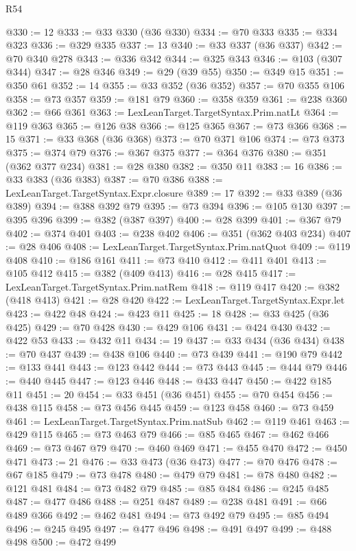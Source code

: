 \begin{lexlean}{R54}
\begin{coremodule}
@330 := 12
@333 := @33 @330 (@36 @330)
@334 := @70 @333
@335 := @334 @323
@336 := @329 @335
@337 := 13
@340 := @33 @337 (@36 @337)
@342 := @70 @340 @278
@343 := @336 @342
@344 := @325 @343
@346 := @103 (@307 @344)
@347 := @28 @346
@349 := @29 (@39 @55)
@350 := @349 @15
@351 := @350 @61
@352 := 14
@355 := @33 @352 (@36 @352)
@357 := @70 @355 @106
@358 := @73 @357
@359 := @181 @79
@360 := @358 @359
@361 := @238 @360
@362 := @66 @361
@363 := LexLeanTarget.TargetSyntax.Prim.natLt
@364 := @119 @363
@365 := @126 @38
@366 := @125 @365
@367 := @73 @366
@368 := 15
@371 := @33 @368 (@36 @368)
@373 := @70 @371 @106
@374 := @73 @373
@375 := @374 @79
@376 := @367 @375
@377 := @364 @376
@380 := @351 (@362 @377 @234)
@381 := @28 @380
@382 := @350 @11
@383 := 16
@386 := @33 @383 (@36 @383)
@387 := @70 @386
@388 := LexLeanTarget.TargetSyntax.Expr.closure
@389 := 17
@392 := @33 @389 (@36 @389)
@394 := @388 @392 @79
@395 := @73 @394
@396 := @105 @130
@397 := @395 @396
@399 := @382 (@387 @397)
@400 := @28 @399
@401 := @367 @79
@402 := @374 @401
@403 := @238 @402
@406 := @351 (@362 @403 @234)
@407 := @28 @406
@408 := LexLeanTarget.TargetSyntax.Prim.natQuot
@409 := @119 @408
@410 := @186 @161
@411 := @73 @410
@412 := @411 @401
@413 := @105 @412
@415 := @382 (@409 @413)
@416 := @28 @415
@417 := LexLeanTarget.TargetSyntax.Prim.natRem
@418 := @119 @417
@420 := @382 (@418 @413)
@421 := @28 @420
@422 := LexLeanTarget.TargetSyntax.Expr.let
@423 := @422 @48
@424 := @423 @11
@425 := 18
@428 := @33 @425 (@36 @425)
@429 := @70 @428
@430 := @429 @106
@431 := @424 @430
@432 := @422 @53
@433 := @432 @11
@434 := 19
@437 := @33 @434 (@36 @434)
@438 := @70 @437
@439 := @438 @106
@440 := @73 @439
@441 := @190 @79
@442 := @133 @441
@443 := @123 @442
@444 := @73 @443
@445 := @444 @79
@446 := @440 @445
@447 := @123 @446
@448 := @433 @447
@450 := @422 @185 @11
@451 := 20
@454 := @33 @451 (@36 @451)
@455 := @70 @454
@456 := @438 @115
@458 := @73 @456 @445
@459 := @123 @458
@460 := @73 @459
@461 := LexLeanTarget.TargetSyntax.Prim.natSub
@462 := @119 @461
@463 := @429 @115
@465 := @73 @463 @79
@466 := @85 @465
@467 := @462 @466
@469 := @73 @467 @79
@470 := @460 @469
@471 := @455 @470
@472 := @450 @471
@473 := 21
@476 := @33 @473 (@36 @473)
@477 := @70 @476
@478 := @67 @185
@479 := @73 @478
@480 := @479 @79
@481 := @78 @480
@482 := @121 @481
@484 := @73 @482 @79
@485 := @85 @484
@486 := @245 @485
@487 := @477 @486
@488 := @251 @487
@489 := @238 @481
@491 := @66 @489 @366
@492 := @462 @481
@494 := @73 @492 @79
@495 := @85 @494
@496 := @245 @495
@497 := @477 @496
@498 := @491 @497
@499 := @488 @498
@500 := @472 @499

\end{coremodule}
\end{lexlean}
